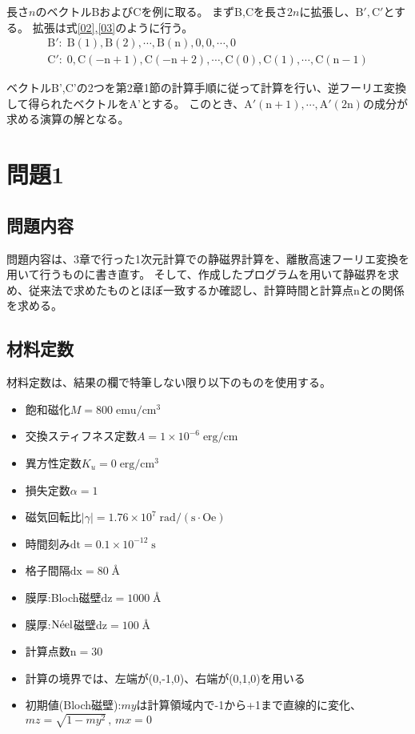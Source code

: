 \documentclass{jsarticle}
\begin{document}
長さ$n$のベクトルBおよびCを例に取る。
まずB,Cを長さ$2n$に拡張し、$\mathrm{B',C'}$とする。
拡張は式\ref{02},\ref{03}のように行う。
\begin{align}
	\mathrm{B':\;B(1),B(2),\cdots,B(n),0,0,\cdots,0}				\label{02} \\
	\mathrm{C':\;0,C(-n+1),C(-n+2),\cdots,C(0),C(1),\cdots,C(n-1)}	\label{03}
\end{align}

ベクトルB',C'の2つを第2章1節の計算手順に従って計算を行い、逆フーリエ変換して得られたベクトルをA'とする。
このとき、$\mathrm{A'(n+1),\cdots,A'(2n)}$の成分が求める演算の解となる。


\section{問題1}
\subsection{問題内容}
問題内容は、3章で行った1次元計算での静磁界計算を、離散高速フーリエ変換を用いて行うものに書き直す。
そして、作成したプログラムを用いて静磁界を求め、従来法で求めたものとほぼ一致するか確認し、計算時間と計算点nとの関係を求める。

\subsection{材料定数}
材料定数は、結果の欄で特筆しない限り以下のものを使用する。
\begin{itemize}
	\item 飽和磁化$M = 800\;\mathrm{emu/cm^3}$
	\item 交換スティフネス定数$A = 1\times 10^{-6}\;\mathrm{erg/cm}$
	\item 異方性定数$K_u = 0\;\mathrm{erg/cm^3}$
	\item 損失定数$\alpha = 1$
	\item 磁気回転比$\lvert\gamma\rvert = 1.76\times 10^7\;\mathrm{rad/(s\cdot Oe)}$
	\item 時間刻み$\mathrm{dt} = 0.1\times 10^{-12}\;\mathrm{s}$
	\item 格子間隔$\mathrm{dx} = 80\;$\AA
	\item 膜厚:Bloch磁壁$\mathrm{dz} = 1000\;$\AA
	\item 膜厚:$\mathrm{N\Acute{e}el}$磁壁$\mathrm{dz} = 100\;$\AA
	\item 計算点数$\mathrm{n} = 30$
	\item 計算の境界では、左端が(0,-1,0)、右端が(0,1,0)を用いる
	\item 初期値(Bloch磁壁):$my$は計算領域内で-1から+1まで直線的に変化、$mz=\sqrt{1-my^2}\,,\,mx=0$
\end{itemize}
\end{document}
